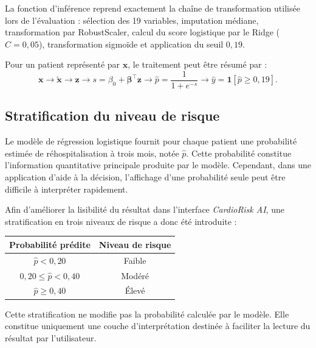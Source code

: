 \documentclass[12pt,a4paper]{report}
\begin{document}
La fonction d'inférence reprend exactement la chaîne de transformation utilisée lors de
l'évaluation : sélection des 19 variables, imputation médiane, transformation par
RobustScaler, calcul du score logistique par le Ridge ($C=0{,}05$), transformation sigmoïde et
application du seuil $0{,}19$.

Pour un patient représenté par $\mathbf{x}$, le traitement peut être résumé par :
\begin{equation}
\mathbf{x}\rightarrow \widetilde{\mathbf{x}}
\rightarrow \mathbf{z}
\rightarrow s=\beta_0+\boldsymbol\beta^\top\mathbf{z}
\rightarrow \hat p=\frac{1}{1+e^{-s}}
\rightarrow \hat y=\mathbf{1}[\hat p\geq0{,}19].
\end{equation}
\subsection{Stratification du niveau de risque}

Le modèle de régression logistique fournit pour chaque patient une probabilité
estimée de réhospitalisation à trois mois, notée $\hat p$. Cette probabilité
constitue l'information quantitative principale produite par le modèle.
Cependant, dans une application d'aide à la décision, l'affichage d'une
probabilité seule peut être difficile à interpréter rapidement.

Afin d'améliorer la lisibilité du résultat dans l'interface \textit{CardioRisk AI},
une stratification en trois niveaux de risque a donc été introduite :

\begin{center}
\renewcommand{\arraystretch}{1.3}
\begin{tabular}{@{}c c@{}}
\toprule
\textbf{Probabilité prédite} & \textbf{Niveau de risque} \\
\midrule
$\hat p < 0{,}20$ & Faible \\
$0{,}20 \leq \hat p < 0{,}40$ & Modéré \\
$\hat p \geq 0{,}40$ & Élevé \\
\bottomrule
\end{tabular}
\end{center}

Cette stratification ne modifie pas la probabilité calculée par le modèle.
Elle constitue uniquement une couche d'interprétation destinée à faciliter
la lecture du résultat par l'utilisateur.
\end{document}
